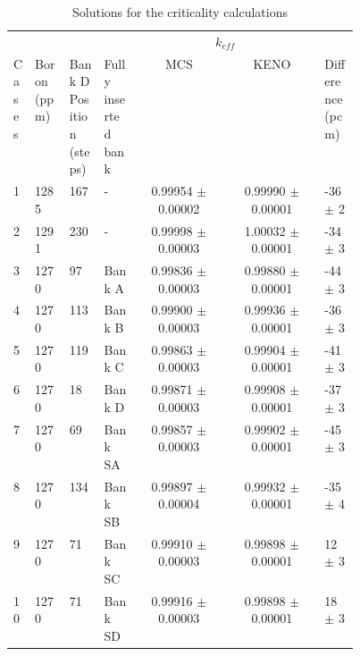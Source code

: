 \documentclass[11pt,a4paper,onecolumn,oneside]{report}
\begin{document}
\begin{table}[!b]
  \centering
  \caption{Solutions for the criticality calculations}
  \label{tab1} 
\begin{adjustbox}{width=0.8\textwidth} %
  \begin{tabular}{| p{0.05\linewidth} | p{0.1\linewidth} | p{0.1\linewidth} | p{0.1\linewidth} | c | c | p{0.1\linewidth} |}
  \hline 
         &             &                 &                     & \multicolumn{2}{c|}{$k_{eff}$}             &            \\
   \cline{5-6}
   Cases & Boron (ppm) & Bank D Position (steps) & Fully inserted bank & MCS                   & KENO                  & Difference (pcm) \\
   \hline
   1     & 1285        & 167             & -                   & 0.99954 $\pm$ 0.00002 & 0.99990 $\pm$ 0.00001 & -36 $\pm$ 2   \\ \hline
   2     & 1291        & 230             & -                   & 0.99998 $\pm$ 0.00003 & 1.00032 $\pm$ 0.00001 & -34 $\pm$ 3   \\ \hline
   3     & 1270        & 97              & Bank A              & 0.99836 $\pm$ 0.00003 & 0.99880 $\pm$ 0.00001 & -44 $\pm$ 3   \\ \hline
   4     & 1270        & 113             & Bank B              & 0.99900 $\pm$ 0.00003 & 0.99936 $\pm$ 0.00001 & -36 $\pm$ 3   \\ \hline
   5     & 1270        & 119             & Bank C              & 0.99863 $\pm$ 0.00003 & 0.99904 $\pm$ 0.00001 & -41 $\pm$ 3   \\ \hline
   6     & 1270        & 18              & Bank D              & 0.99871 $\pm$ 0.00003 & 0.99908 $\pm$ 0.00001 & -37 $\pm$ 3   \\ \hline
   7     & 1270        & 69              & Bank SA             & 0.99857 $\pm$ 0.00003 & 0.99902 $\pm$ 0.00001 & -45 $\pm$ 3   \\ \hline
   8     & 1270        & 134             & Bank SB             & 0.99897 $\pm$ 0.00004 & 0.99932 $\pm$ 0.00001 & -35 $\pm$ 4   \\ \hline
   9     & 1270        & 71              & Bank SC             & 0.99910 $\pm$ 0.00003 & 0.99898 $\pm$ 0.00001 & 12  $\pm$ 3   \\ \hline
   10    & 1270        & 71              & Bank SD             & 0.99916 $\pm$ 0.00003 & 0.99898 $\pm$ 0.00001 & 18  $\pm$ 3   \\ \hline
  \end{tabular}
  \end{adjustbox}
\end{table}
\end{document}
